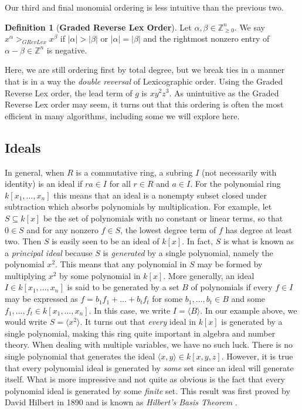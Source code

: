 \documentclass[MS, xcolor=dvipsnames]{wfuthesis}
\def\bZ{\mathbb{Z}}
\def\sbs{\subseteq}
\theoremstyle{definition}
\newtheorem{definition}[theorem]{Definition}
\begin{document}
Our third and final monomial ordering is less intuitive than the previous two.
\begin{definition}[\bf Graded Reverse Lex Order]
  Let $\alpha,\beta \in \bZ_{\ge0}^n$. We say $x^\alpha >_{GRevLex} x^\beta$ if $|\alpha| > |\beta|$ or $|\alpha|=|\beta|$ and the rightmost nonzero entry of $\alpha - \beta \in \bZ^n$ is negative. 
\end{definition}
Here, we are still ordering first by total degree, but we break ties in a manner that is in a way the \emph{double reversal} of Lexicographic order. Using the Graded Reverse Lex order, the lead term of $g$ is $xy^2z^3$. As unintuitive as the Graded Reverse Lex order may seem, it turns out that this ordering is often the most efficient in many algorithms, including some we will explore here. 

\subsection{Ideals}
In general, when $R$ is a commutative ring, a subring $I$ (not necessarily with identity) is an ideal if $ra \in I$ for all $r \in R$ and $a \in I$. For the polynomial ring $k[x_1,\dots,x_n]$ this means that an ideal is a nonempty subset closed under subtraction which absorbs polynomials by multiplication. For example, let $S \sbs k[x]$ be the set of polynomials with no constant or linear terms, so that $0 \in S$ and for any nonzero $f \in S$, the lowest degree term of $f$ has degree at least two. Then $S$ is easily seen to be an ideal of $k[x]$. In fact, $S$ is what is known as a \textit{principal ideal} because $S$ is \textit{generated} by a single polynomial, namely the polynomial $x^2$. This means that any polynomial in $S$ may be formed by multiplying $x^2$ by some polynomial in $k[x]$. More generally, an ideal $I \in k[x_1,\dots,x_n]$ is said to be generated by a set $B$ of polynomials if every $f \in I$ may be expressed as $f = b_1f_1 + \dots + b_tf_t$ for some $b_1,\dots,b_t \in B$ and some $f_1,\dots,f_t \in k[x_1,\dots,x_n]$. In this case, we write $I = \langle B \rangle$. In our example above, we would write $S = \langle x^2 \rangle$. It turns out that \textit{every} ideal in $k[x]$ is generated by a single polynomial, making this ring quite important in algebra and number theory. When dealing with multiple variables, we have no such luck. There is no single polynomial that generates the ideal $\langle x,y \rangle \in k[x,y,z]$. However, it is true that every polynomial ideal is generated by \textit{some} set since an ideal will generate itself. What is more impressive and not quite as obvious is the fact that every polynomial ideal is generated by some \textit{finite} set. This result was first proved by David Hilbert in 1890 and is known as \textit{Hilbert's Basis Theorem} \cite{Hilbert1890}. \par 
\end{document}

